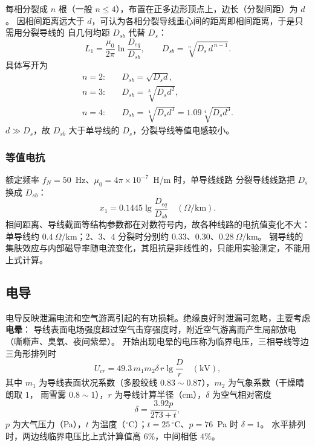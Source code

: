 每相分裂成 $n$ 根（一般 $n\le4$），布置在正多边形顶点上，边长（分裂间距）为 $d$。
因相间距离远大于 $d$，可认为各相分裂导线重心间的距离即相间距离，于是只需用分裂导线的
自几何均距 $D_{sb}$ 代替 $D_s$：
\begin{equation}
  L_1=\frac{\mu_0}{2\pi}\ln\frac{D_{eq}}{D_{sb}},\qquad
  D_{sb}=\sqrt[n]{D_s\,d^{\,n-1}} .
\end{equation}
具体写开为
\begin{align}
  n=2:&\quad D_{sb}=\sqrt{D_s d},\\
  n=3:&\quad D_{sb}=\sqrt[3]{D_s d^{2}},\\
  n=4:&\quad D_{sb}=\sqrt[4]{D_s d^{3}}=1.09\sqrt[4]{D_s d^{3}} .
\end{align}
$d\gg D_s$，故 $D_{sb}$ 大于单导线的 $D_s$，分裂导线等值电感较小。

\subsubsection{等值电抗}

额定频率 $f_N=50$~Hz、$\mu_0=4\pi\times10^{-7}$~H/m 时，单导线线路
分裂导线线路把 $D_s$ 换成 $D_{sb}$：
\begin{equation}
  x_1=0.1445\lg\frac{D_{eq}}{D_{sb}}\quad(\Omega/\text{km}).
\end{equation}
相间距离、导线截面等结构参数都在对数符号内，故各种线路的电抗值变化不大：
单导线约 $0.4\ \Omega/\text{km}$；$2$、$3$、$4$ 分裂时分别约 $0.33$、$0.30$、$0.28\ \Omega/\text{km}$。
钢导线的集肤效应与内部磁导率随电流变化，其阻抗是非线性的，只能用实验测定，不能用上式计算。

\subsection{电导}

电导反映泄漏电流和空气游离引起的有功损耗。绝缘良好时泄漏可忽略，主要考虑\textbf{电晕}：
导线表面电场强度超过空气击穿强度时，附近空气游离而产生局部放电（嘶嘶声、臭氧、夜间紫晕）。
开始出现电晕的电压称为临界电压，三相导线等边三角形排列时
\begin{equation}
  U_{cr}=49.3\,m_1 m_2 \delta\, r\lg\frac{D}{r}\quad(\text{kV}),
\end{equation}
其中 $m_1$ 为导线表面状况系数（多股绞线 $0.83\sim0.87$），$m_2$ 为气象系数（干燥晴朗取 $1$，
雨雪雾 $0.8\sim1$），$r$ 为导线计算半径（cm），$\delta$ 为空气相对密度
\begin{equation}
  \delta=\frac{3.92p}{273+t},
\end{equation}
$p$ 为大气压力（Pa），$t$ 为温度（$^\circ$C）；$t=25\,^\circ$C、$p=76$~Pa 时 $\delta=1$。
水平排列时，两边线临界电压比上式计算值高 $6\%$，中间相低 $4\%$。

